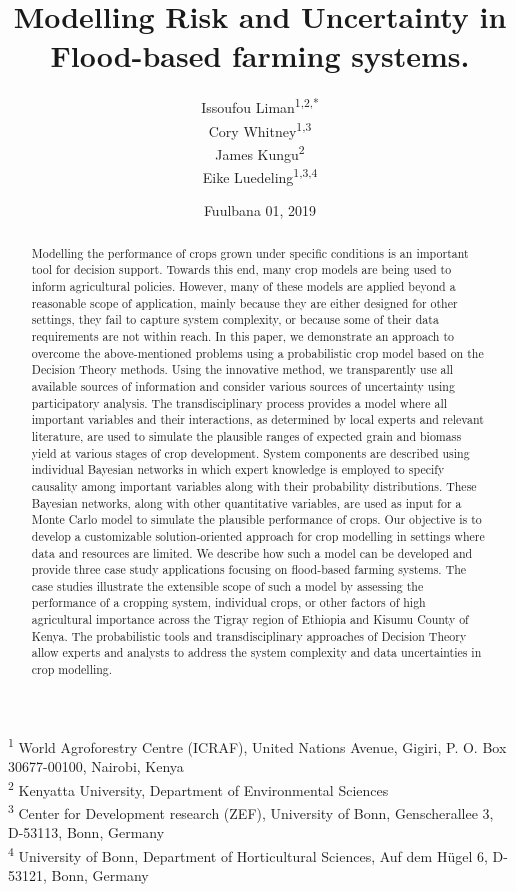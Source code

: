 \documentclass[12pt,oneside]{article}
\title{Modelling Risk and Uncertainty in Flood-based farming systems.}
\author{Issoufou Liman\textsuperscript{1,2,*} \\ Cory Whitney\textsuperscript{1,3} \\ James Kungu\textsuperscript{2} \\ Eike Luedeling\textsuperscript{1,3,4}}
\date{Fuulbana 01, 2019}
\begin{document}
\maketitle
\begin{abstract}
Modelling the performance of crops grown under specific conditions is an important tool for decision support. Towards this end, many crop models are being used to inform agricultural policies. However, many of these models are applied beyond a reasonable scope of application, mainly because they are either designed for other settings, they fail to capture system complexity, or because some of their data requirements are not within reach. In this paper, we demonstrate an approach to overcome the above-mentioned problems using a probabilistic crop model based on the Decision Theory methods. Using the innovative method, we transparently use all available sources of information and consider various sources of uncertainty using participatory analysis. The transdisciplinary process provides a model where all important variables and their interactions, as determined by local experts and relevant literature, are used to simulate the plausible ranges of expected grain and biomass yield at various stages of crop development. System components are described using individual Bayesian networks in which expert knowledge is employed to specify causality among important variables along with their probability distributions. These Bayesian networks, along with other quantitative variables, are used as input for a Monte Carlo model to simulate the plausible performance of crops. Our objective is to develop a customizable solution-oriented approach for crop modelling in settings where data and resources are limited. We describe how such a model can be developed and provide three case study applications focusing on flood-based farming systems. The case studies illustrate the extensible scope of such a model by assessing the performance of a cropping system, individual crops, or other factors of high agricultural importance across the Tigray region of Ethiopia and Kisumu County of Kenya. The probabilistic tools and transdisciplinary approaches of Decision Theory allow experts and analysts to address the system complexity and data uncertainties in crop modelling.
\end{abstract}

{
\hypersetup{linkcolor=black}
\setcounter{tocdepth}{5}
\tableofcontents
}
\textsuperscript{1} World Agroforestry Centre (ICRAF), United Nations Avenue, Gigiri, P. O. Box 30677-00100, Nairobi, Kenya\\
\textsuperscript{2} Kenyatta University, Department of Environmental Sciences\\
\textsuperscript{3} Center for Development research (ZEF), University of Bonn, Genscherallee 3, D-53113, Bonn, Germany\\
\textsuperscript{4} University of Bonn, Department of Horticultural Sciences, Auf dem Hügel 6, D-53121, Bonn, Germany
\end{document}
